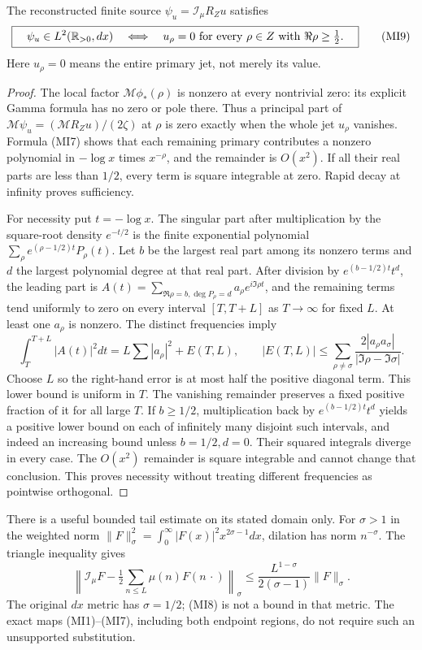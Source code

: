 \documentclass[11pt]{article}
\begin{document}
\begin{corollary}
The reconstructed finite source $\psi_u=\mathcal I_\mu R_Zu$
satisfies
\[
 \boxed{\quad\psi_u\in L^2(\mathbb R_{>0},dx)
 \quad\Longleftrightarrow\quad
 u_\rho=0\ \text{for every }\rho\in Z\text{ with }
                         \Re\rho\geq\tfrac12.\quad}\tag{MI9}
\]
Here $u_\rho=0$ means the entire primary jet, not merely its value.
\end{corollary}
\begin{proof}
The local factor $\mathcal M\phi_*(\rho)$ is nonzero at every
nontrivial zero: its explicit Gamma formula has no zero or pole
there. Thus a principal part of
$\mathcal M\psi_u=(\mathcal MR_Zu)/(2\zeta)$ at $\rho$ is zero
exactly when the whole jet $u_\rho$ vanishes. Formula (MI7) shows
that each remaining primary contributes a nonzero polynomial in
$-\log x$ times $x^{-\rho}$, and the remainder is $O(x^2)$.
If all their real parts are less than $1/2$, every term is square
integrable at zero. Rapid decay at infinity proves sufficiency.

For necessity put $t=-\log x$. The singular part after multiplication
by the square-root density $e^{-t/2}$ is the finite exponential
polynomial $\sum_\rho e^{(\rho-1/2)t}P_\rho(t)$.
Let $b$ be the largest real part among its nonzero terms and $d$
the largest polynomial degree at that real part. After division by
$e^{(b-1/2)t}t^d$, the leading part is
$A(t)=\sum_{\Re\rho=b,\deg P_\rho=d}a_\rho e^{i\Im\rho t}$,
and the remaining terms tend uniformly to zero on every interval
$[T,T+L]$ as $T\to\infty$ for fixed $L$. At least one $a_\rho$
is nonzero. The distinct frequencies imply
\[
 \int_T^{T+L}|A(t)|^2dt
 =L\sum|a_\rho|^2+E(T,L),\qquad
 |E(T,L)|\leq
  \sum_{\rho\ne\sigma}\frac{2|a_\rho a_\sigma|}
                                    {|\Im\rho-\Im\sigma|}.
\]
Choose $L$ so the right-hand error is at most half the positive
diagonal term. This lower bound is uniform in $T$. The vanishing
remainder preserves a fixed positive fraction of it for all large
$T$. If $b\geq1/2$, multiplication back by
$e^{(b-1/2)t}t^d$ yields a positive lower bound on each of infinitely
many disjoint such intervals, and indeed an increasing bound unless
$b=1/2,d=0$. Their squared integrals diverge in every case. The
$O(x^2)$ remainder is square integrable and cannot change that
conclusion. This proves necessity without treating different
frequencies as pointwise orthogonal.
\end{proof}

There is a useful bounded tail estimate on its stated domain only.
For $\sigma>1$ in the weighted norm
$\|F\|_\sigma^2=\int_0^\infty|F(x)|^2x^{2\sigma-1}dx$,
dilation has norm $n^{-\sigma}$. The triangle inequality gives
\[
 \left\|\mathcal I_\mu F-\tfrac12\sum_{n\leq L}\mu(n)F(n\,\cdot)
 \right\|_\sigma
 \leq\frac{L^{1-\sigma}}{2(\sigma-1)}\|F\|_\sigma.
 \tag{MI8}
\]
The original $dx$ metric has $\sigma=1/2$; (MI8) is not a bound
in that metric. The exact maps (MI1)--(MI7), including both endpoint
regions, do not require such an unsupported substitution.
\end{document}
